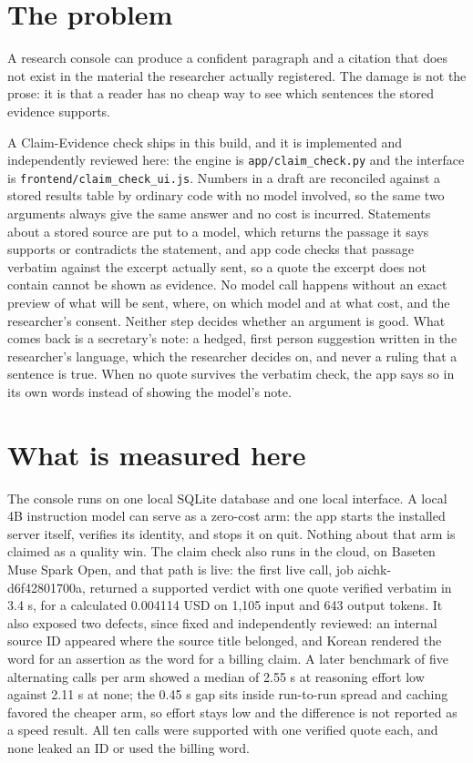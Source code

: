 \documentclass{article}
\begin{document}
\section{The problem}

A research console can produce a confident paragraph and a citation that does not exist in
the material the researcher actually registered. The damage is not the prose: it is that a
reader has no cheap way to see which sentences the stored evidence supports.

A Claim-Evidence check ships in this build, and it is implemented and independently
reviewed here: the engine is \texttt{app/claim\_check.py} and the interface is
\texttt{frontend/claim\_check\_ui.js}. Numbers in a draft are reconciled against a stored results
table by ordinary code with no model involved, so the same two arguments always give the
same answer and no cost is incurred. Statements about a stored source are put to a model,
which returns the passage it says supports or contradicts the statement, and app code
checks that passage verbatim against the excerpt actually sent, so a quote the excerpt does
not contain cannot be shown as evidence. No model call happens without an exact preview of
what will be sent, where, on which model and at what cost, and the researcher's consent.
Neither step decides whether an argument is good. What comes back is a secretary's note: a
hedged, first person suggestion written in the researcher's language, which the researcher
decides on, and never a ruling that a sentence is true. When no quote survives the verbatim
check, the app says so in its own words instead of showing the model's note.

\section{What is measured here}

The console runs on one local SQLite database and one local interface. A local 4B
instruction model can serve as a zero-cost arm: the app starts the installed server itself,
verifies its identity, and stops it on quit. Nothing about that arm is claimed as a quality
win. The claim check also runs in the cloud, on Baseten Muse Spark Open, and that path is
live: the first live call, job aichk-d6f42801700a, returned a supported verdict with one
quote verified verbatim in 3.4 s, for a calculated 0.004114 USD on 1,105 input and 643
output tokens. It also exposed two defects, since fixed and independently reviewed: an
internal source ID appeared where the source title belonged, and Korean rendered the word
for an assertion as the word for a billing claim. A later benchmark of five alternating
calls per arm showed a median of 2.55 s at reasoning effort low against 2.11 s at none; the
0.45 s gap sits inside run-to-run spread and caching favored the cheaper arm, so effort
stays low and the difference is not reported as a speed result. All ten calls were
supported with one verified quote each, and none leaked an ID or used the billing word.
\end{document}

